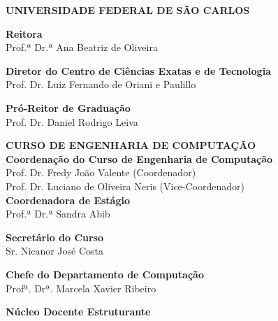 \documentclass[11pt,a4paper]{report}
\begin{document}
\clearpage
\thispagestyle{empty}
\begin{center}
    \singlespacing
    \Large
    \textbf{UNIVERSIDADE FEDERAL DE SÃO CARLOS}

    \vspace{1.5ex}
    \textbf{Reitora} \\
    Prof.ª Dr.ª Ana Beatriz de Oliveira

    \vspace{1.5ex}
    \textbf{Diretor do Centro de Ciências Exatas e de Tecnologia} \\
    Prof. Dr. Luiz Fernando de Oriani e Paulillo 

    \vspace{1.5ex}
    \textbf{Pró-Reitor de Graduação} \\
    Prof. Dr. Daniel Rodrigo Leiva

    \vspace{1.5ex}
    \textbf{CURSO DE ENGENHARIA DE COMPUTAÇÃO} \\

    \vspace{1.5ex}
    \textbf{Coordenação do Curso de Engenharia de Computação} \\
    Prof. Dr. Fredy João Valente (Coordenador)\\
    Prof. Dr. Luciano de Oliveira Neris (Vice-Coordenador)\\

    \vspace{1.5ex}
    \textbf{Coordenadora de Estágio}\\
    Prof.ª Dr.ª Sandra Abib


    \vspace{1.5ex}
    \textbf{Secretário do Curso}\\
    Sr. Nicanor José Costa

    \vspace{1.5ex}
    \textbf{Chefe do Departamento de Computação}\\
     Profª. Drª. Marcela Xavier Ribeiro 

    \vspace{1.5ex}
    \textbf{Núcleo Docente Estruturante}\\
    

\end{center}
\end{document}
